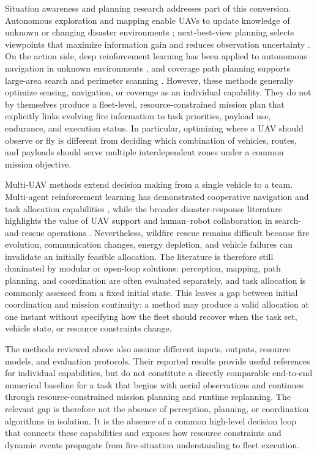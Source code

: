 Situation awareness and planning research addresses part of this conversion.
Autonomous exploration and mapping enable UAVs to update knowledge of unknown
or changing disaster environments \cite{popovic2021uavdisaster}; next-best-view
planning selects viewpoints that maximize information gain and reduces
observation uncertainty \cite{bircher2016nbv}. On the action side, deep
reinforcement learning has been applied to autonomous navigation in unknown
environments \cite{xiao2021uavrl}, and coverage path planning supports
large-area search and perimeter scanning \cite{yu2022coverageuav}. However,
these methods generally optimize sensing, navigation, or coverage as an
individual capability. They do not by themselves produce a fleet-level,
resource-constrained mission plan that explicitly links evolving fire
information to task priorities, payload use, endurance, and execution status.
In particular, optimizing where a UAV should observe or fly is different from
deciding which combination of vehicles, routes, and payloads should serve
multiple interdependent zones under a common mission objective.

Multi-UAV methods extend decision making from a single vehicle to a team.
Multi-agent reinforcement learning has demonstrated cooperative navigation and
task allocation capabilities \cite{yang2023multiagentuav}, while the broader
disaster-response literature highlights the value of UAV support and
human--robot collaboration in search-and-rescue operations
\cite{waharte2021uavsar}. Nevertheless, wildfire rescue remains difficult
because fire evolution, communication changes, energy depletion, and vehicle
failures can invalidate an initially feasible allocation. The literature is
therefore still dominated by modular or open-loop solutions: perception,
mapping, path planning, and coordination are often evaluated separately, and
task allocation is commonly assessed from a fixed initial state. This leaves a
gap between initial coordination and mission continuity: a method may produce a
valid allocation at one instant without specifying how the fleet should recover
when the task set, vehicle state, or resource constraints change.

The methods reviewed above also assume different inputs, outputs, resource
models, and evaluation protocols. Their reported results provide useful
references for individual capabilities, but do not constitute a directly
comparable end-to-end numerical baseline for a task that begins with aerial
observations and continues through resource-constrained mission planning and
runtime replanning.
The relevant gap is therefore not the absence of perception, planning, or
coordination algorithms in isolation. It is the absence of a common high-level
decision loop that connects these capabilities and exposes how resource
constraints and dynamic events propagate from fire-situation understanding to
fleet execution.

